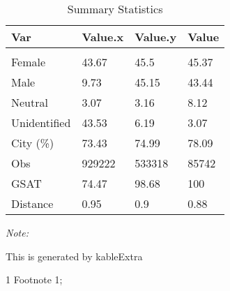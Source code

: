 \begin{table}
\centering
\caption{Summary Statistics}
\centering
\begin{threeparttable}
\begin{tabular}[t]{llll}
\toprule
Var & Value.x & Value.y & Value\\
\midrule
\addlinespace[0.3em]
\multicolumn{4}{l}{\textit{\textbf{Gender}}}\\
\hspace{1em}Female & 43.67 & 45.5 & 45.37\\
\hspace{1em}Male & 9.73 & 45.15 & 43.44\\
\hspace{1em}Neutral & 3.07 & 3.16 & 8.12\\
\hspace{1em}Unidentified & 43.53 & 6.19 & 3.07\\
City (\%) & 73.43 & 74.99 & 78.09\\
Obs & 929222 & 533318 & 85742\\
GSAT & 74.47 & 98.68 & 100\\
Distance & 0.95 & 0.9 & 0.88\\
\bottomrule
\end{tabular}
\begin{tablenotes}
\item \textit{Note: } 
\item This is generated by kableExtra
\item[1] Footnote 1; 
\end{tablenotes}
\end{threeparttable}
\end{table}
